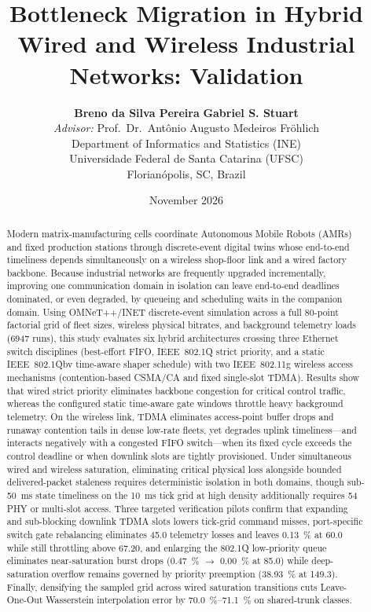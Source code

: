 \documentclass[11pt,a4paper]{article}
\title{\textbf{Bottleneck Migration in Hybrid Wired and Wireless Industrial Networks: Validation}}
\author{
  \textbf{Breno da Silva Pereira} \qquad\qquad \textbf{Gabriel S. Stuart} \\[1.2ex]
  \textit{Advisor:} Prof.\ Dr.\ Ant\^{o}nio Augusto Medeiros Fr\"{o}hlich \\[1.2ex]
  Department of Informatics and Statistics (INE) \\
  Universidade Federal de Santa Catarina (UFSC) \\
  Florian\'{o}polis, SC, Brazil
}
\date{November 2026}
\begin{document}
\maketitle

\begin{abstract}
Modern matrix-manufacturing cells coordinate Autonomous Mobile Robots (AMRs) and fixed production stations through discrete-event digital twins whose end-to-end timeliness depends simultaneously on a wireless shop-floor link and a wired factory backbone. Because industrial networks are frequently upgraded incrementally, improving one communication domain in isolation can leave end-to-end deadlines dominated, or even degraded, by queueing and scheduling waits in the companion domain. Using OMNeT++/INET discrete-event simulation across a full 80-point factorial grid of fleet sizes, wireless physical bitrates, and background telemetry loads (\num{6947} runs), this study evaluates six hybrid architectures crossing three Ethernet switch disciplines (best-effort FIFO, IEEE~802.1Q strict priority, and a static IEEE~802.1Qbv time-aware shaper schedule) with two IEEE~802.11g wireless access mechanisms (contention-based CSMA/CA and fixed single-slot TDMA). Results show that wired strict priority eliminates backbone congestion for critical control traffic, whereas the configured static time-aware gate windows throttle heavy background telemetry. On the wireless link, TDMA eliminates access-point buffer drops and runaway contention tails in dense low-rate fleets, yet degrades uplink timeliness---and interacts negatively with a congested FIFO switch---when its fixed cycle exceeds the control deadline or when downlink slots are tightly provisioned. Under simultaneous wired and wireless saturation, eliminating critical physical loss alongside bounded delivered-packet staleness requires deterministic isolation in both domains, though sub-\qty{50}{\milli\second} state timeliness on the \qty{10}{\milli\second} tick grid at high density additionally requires \qty{54}{\mbps} PHY or multi-slot access. Three targeted verification pilots confirm that expanding and sub-blocking downlink TDMA slots lowers tick-grid command misses, port-specific switch gate rebalancing eliminates \qty{45.0}{\mbps} telemetry losses and leaves \qty{0.13}{\percent} at \qty{60.0}{\mbps} while still throttling above \qty{67.20}{\mbps}, and enlarging the 802.1Q low-priority queue eliminates near-saturation burst drops (\qty{0.47}{\percent} $\to$ \qty{0.00}{\percent} at \qty{85.0}{\mbps}) while deep-saturation overflow remains governed by priority preemption (\qty{38.93}{\percent} at \qty{149.3}{\mbps}). Finally, densifying the sampled grid across wired saturation transitions cuts Leave-One-Out Wasserstein interpolation error by \qtyrange{70.0}{71.1}{\percent} on shared-trunk classes.
\end{abstract}
\end{document}
